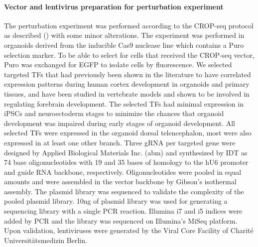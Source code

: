 \paragraph{Vector and lentivirus preparation for perturbation experiment}
The perturbation experiment was performed according to the CROP-seq protocol as described (\cite{datlinger_pooled_2017}) with some minor alterations. The experiment was performed in organoids derived from the inducible Cas9 nuclease line which contains a Puro selection marker. To be able to select for cells that received the CROP-seq vector, Puro was exchanged for EGFP to isolate cells by fluorescence. We selected targeted TFs that had previously been shown in the literature to have correlated expression patterns during human cortex development in organoids and primary tissues, and have been studied in vertebrate models and shown to be involved in regulating forebrain development. The selected TFs had minimal expression in iPSCs and neuroectoderm stages to minimize the chances that organoid development was impaired during early stages of organoid development. All selected TFs were expressed in the organoid dorsal telencephalon, most were also expressed in at least one other branch. Three gRNA per targeted gene were designed by Applied Biological Materials Inc. (abm) and synthesized by IDT as 74 base oligonucleotides with 19 and 35 bases of homology to the hU6 promoter and guide RNA backbone, respectively. Oligonucleotides were pooled in equal amounts and were assembled in the vector backbone by Gibson's isothermal assembly. The plasmid library was sequenced to validate the complexity of the pooled plasmid library. 10ng of plasmid library was used for generating a sequencing library with a single PCR reaction. Illumina i7 and i5 indices were added by PCR and the library was sequenced on Illumina's MiSeq platform. Upon validation, lentiviruses were generated by the Viral Core Facility of Charité Universitätsmedizin Berlin.
 
